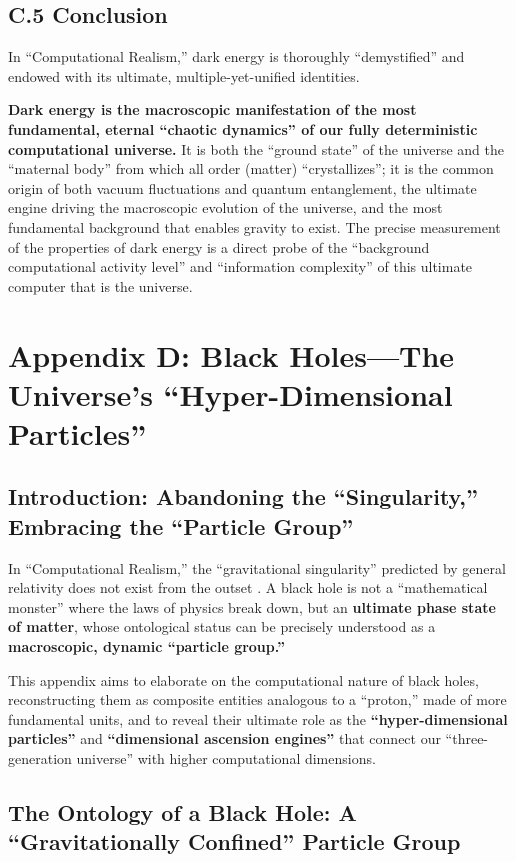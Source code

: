 \documentclass[11pt, a4paper]{article}
\begin{document}
\subsection*{C.5 Conclusion}
In ``Computational Realism,'' dark energy is thoroughly ``demystified'' and endowed with its ultimate, multiple-yet-unified identities.

\textbf{Dark energy is the macroscopic manifestation of the most fundamental, eternal ``chaotic dynamics'' of our fully deterministic computational universe.} It is both the ``ground state'' of the universe and the ``maternal body'' from which all order (matter) ``crystallizes''; it is the common origin of both vacuum fluctuations and quantum entanglement, the ultimate engine driving the macroscopic evolution of the universe, and the most fundamental background that enables gravity to exist. The precise measurement of the properties of dark energy is a direct probe of the ``background computational activity level'' and ``information complexity'' of this ultimate computer that is the universe.


\section{Appendix D: Black Holes—The Universe's ``Hyper-Dimensional Particles''}

\subsection{Introduction: Abandoning the ``Singularity,'' Embracing the ``Particle Group''}

In ``Computational Realism,'' the ``gravitational singularity'' predicted by general relativity does not exist from the outset \cite{Einstein1905}. A black hole is not a ``mathematical monster'' where the laws of physics break down, but an \textbf{ultimate phase state of matter}, whose ontological status can be precisely understood as a \textbf{macroscopic, dynamic ``particle group.''}

This appendix aims to elaborate on the computational nature of black holes, reconstructing them as composite entities analogous to a ``proton,'' made of more fundamental units, and to reveal their ultimate role as the \textbf{``hyper-dimensional particles''} and \textbf{``dimensional ascension engines''} that connect our ``three-generation universe'' with higher computational dimensions.

\subsection{The Ontology of a Black Hole: A ``Gravitationally Confined'' Particle Group}
\end{document}
